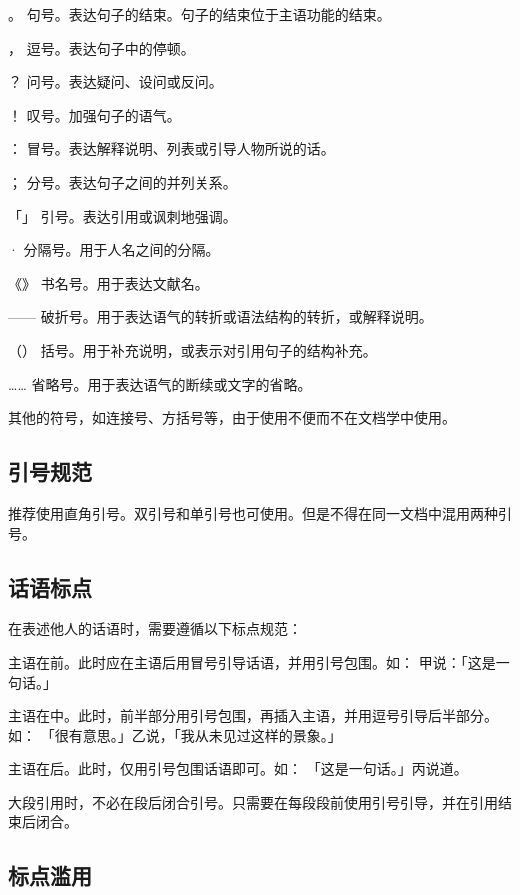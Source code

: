 \documentclass{fo-article}
\begin{document}
\item [。] 句号。表达句子的结束。句子的结束位于主语功能的结束。
\item [，] 逗号。表达句子中的停顿。
\item [？] 问号。表达疑问、设问或反问。
\item [！] 叹号。加强句子的语气。
\item [：] 冒号。表达解释说明、列表或引导人物所说的话。
\item [；] 分号。表达句子之间的并列关系。
\item [「」] 引号。表达引用或讽刺地强调。
\item [·] 分隔号。用于人名之间的分隔。
\item [《》] 书名号。用于表达文献名。
\item [——] 破折号。用于表达语气的转折或语法结构的转折，或解释说明。
\item [（）] 括号。用于补充说明，或表示对引用句子的结构补充。
\item [……] 省略号。用于表达语气的断续或文字的省略。
\descx

其他的符号，如连接号、方括号等，由于使用不便而不在文档学中使用。

\subsection{引号规范}

推荐使用直角引号。双引号和单引号也可使用。但是不得在同一文档中混用两种引号。

\subsection{话语标点}

在表述他人的话语时，需要遵循以下标点规范：

\li 
\item 主语在前。此时应在主语后用冒号引导话语，并用引号包围。如：
甲说：「这是一句话。」
\item 主语在中。此时，前半部分用引号包围，再插入主语，并用逗号引导后半部分。如：
「很有意思。」乙说，「我从未见过这样的景象。」
\item 主语在后。此时，仅用引号包围话语即可。如：
「这是一句话。」丙说道。
\item 大段引用时，不必在段后闭合引号。只需要在每段段前使用引号引导，并在引用结束后闭合。
\lix

\subsection{标点滥用}
\end{document}
